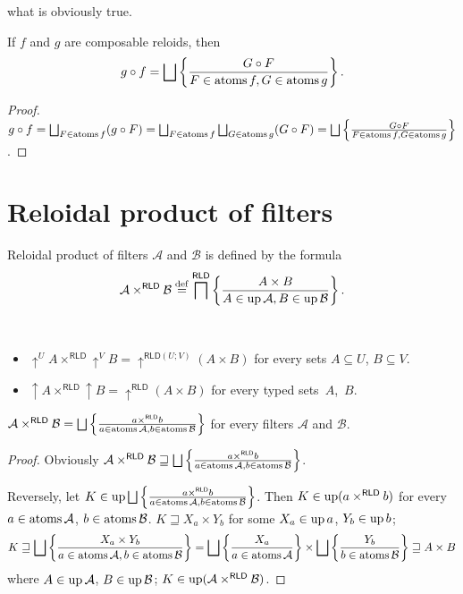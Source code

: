 what is obviously true.
\begin{cor}
\label{rld-comp-at}If $f$ and $g$ are composable reloids, then
\[
g\circ f=\bigsqcup\left\{ \frac{G\circ F}{F\in\operatorname{atoms} f,G\in\operatorname{atoms} g}\right\}.
\]
\end{cor}
\begin{proof}
$g\circ f=\bigsqcup_{F\in\operatorname{atoms} f}(g\circ F)=\bigsqcup_{F\in\operatorname{atoms} f}\bigsqcup_{G\in\operatorname{atoms} g}(G\circ F)=\bigsqcup\left\{ \frac{G\circ F}{F\in\operatorname{atoms} f,G\in\operatorname{atoms} g}\right\}$.
\end{proof}

\section{Reloidal product of filters}
\begin{defn}
Reloidal product of filters $\mathcal{A}$
and $\mathcal{B}$ is defined by the formula
\[
\mathcal{A}\times^{\mathsf{RLD}}\mathcal{B}\overset{\mathrm{def}}{=}\bigsqcap^{\mathsf{RLD}}\left\{ \frac{A\times B}{A\in\operatorname{up}\mathcal{A},B\in\operatorname{up}\mathcal{B}}\right\}.
\]
\end{defn}
\begin{obvious}
~
\begin{itemize}
\item $\uparrow^{U}A\times^{\mathsf{RLD}}\uparrow^{V}B=\uparrow^{\mathsf{RLD}(U;V)}(A\times B)$
for every sets $A\subseteq U$, $B\subseteq V$.
\item $\uparrow A\times^{\mathsf{RLD}}\uparrow B=\uparrow^{\mathsf{RLD}}(A\times B)$
for every typed sets~$A$,~$B$.\end{itemize}
\end{obvious}
\begin{thm}
\label{rld-prod-t-atoms}$\mathcal{A}\times^{\mathsf{RLD}}\mathcal{B}=\bigsqcup\left\{ \frac{a\times^{\mathsf{RLD}}b}{a\in\operatorname{atoms}\mathcal{A},b\in\operatorname{atoms}\mathcal{B}}\right\}$
for every filters $\mathcal{A}$ and $\mathcal{B}$.\end{thm}
\begin{proof}
Obviously $\mathcal{A}\times^{\mathsf{RLD}}\mathcal{B}\sqsupseteq\bigsqcup\left\{ \frac{a\times^{\mathsf{RLD}}b}{a\in\operatorname{atoms}\mathcal{A},b\in\operatorname{atoms}\mathcal{B}}\right\}$.

Reversely, let $K\in\operatorname{up}\bigsqcup\left\{ \frac{a\times^{\mathsf{RLD}}b}{a\in\operatorname{atoms}\mathcal{A},b\in\operatorname{atoms}\mathcal{B}}\right\}$.
Then $K\in\operatorname{up}(a\times^{\mathsf{RLD}}b)$ for every $a\in\operatorname{atoms}\mathcal{A}$,
$b\in\operatorname{atoms}\mathcal{B}$. $K\sqsupseteq X_{a}\times Y_{b}$ for some
$X_{a}\in\operatorname{up} a$, $Y_{b}\in\operatorname{up} b$; 
\[
K\sqsupseteq\bigsqcup\left\{ \frac{X_{a}\times Y_{b}}{a\in\operatorname{atoms}\mathcal{A},b\in\operatorname{atoms}\mathcal{B}}\right\}=\bigsqcup\left\{ \frac{X_{a}}{a\in\operatorname{atoms}\mathcal{A}}\right\}\times\bigsqcup\left\{ \frac{Y_{b}}{b\in\operatorname{atoms}\mathcal{B}}\right\}\sqsupseteq A\times B
\]
 where $A\in\operatorname{up}\mathcal{A}$, $B\in\operatorname{up}\mathcal{B}$; $K\in\operatorname{up}(\mathcal{A}\times^{\mathsf{RLD}}\mathcal{B})$.\end{proof}
